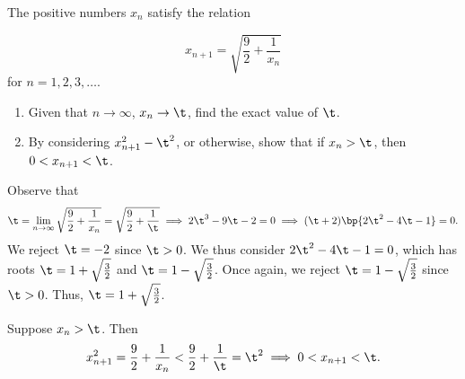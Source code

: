 \begin{problem}
    The positive numbers $x_n$ satisfy the relation
    
    \[
        x_{n+1} = \sqrt{\frac92 + \frac1{x_n}}
    \]
    for $n = 1, 2, 3, \ldots$.

    \begin{enumerate}
        \item Given that $n \to \infty$, $x_n \to \t$, find the exact value of $\t$.
        \item By considering $x^2_{n+1} - \t^2$, or otherwise, show that if $x_n > \t$, then $0 < x_{n+1} < \t$.
    \end{enumerate}
\end{problem}
\begin{solution}
    \begin{ppart}
        Observe that \[\t = \lim_{n \to \infty} \sqrt{\frac92 + \frac1{x_n}} = \sqrt{\frac92 + \frac1{\t}} \implies 2\t^3 - 9\t - 2  = 0 \implies (\t + 2)\bp{2\t^2 - 4\t - 1} = 0.\] We reject $\t = -2$ since $\t > 0$. We thus consider $2\t^2 -4\t -1 = 0$, which has roots $\t = 1 + \sqrt{\frac32}$ and $\t = 1 - \sqrt{\frac32}$. Once again, we reject $\t = 1 - \sqrt{\frac32}$ since $\t > 0$. Thus, $\t = 1 + \sqrt{\frac32}$.
    \end{ppart}
    \begin{ppart}
        Suppose $x_n > \t$. Then \[x_{n+1}^2 = \frac92 + \frac1{x_n} < \frac92 + \frac1\t = \t^2 \implies 0 < x_{n+1} < \t.\]
    \end{ppart}
\end{solution}